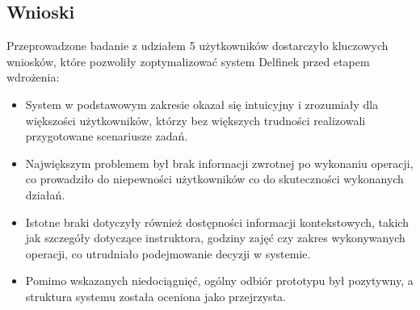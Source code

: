 \documentclass[a4paper,12pt]{article}
\begin{document}
\subsection{Wnioski}
 
Przeprowadzone badanie z udziałem 5 użytkowników dostarczyło kluczowych wniosków, które pozwoliły zoptymalizować system Delfinek przed etapem wdrożenia:
 
\begin{itemize}
    \item System w podstawowym zakresie okazał się intuicyjny i zrozumiały dla większości użytkowników, którzy bez większych trudności realizowali przygotowane scenariusze zadań.
    \item Największym problemem był brak informacji zwrotnej po wykonaniu operacji, co prowadziło do niepewności użytkowników co do skuteczności wykonanych działań.
    \item Istotne braki dotyczyły również dostępności informacji kontekstowych, takich jak szczegóły dotyczące instruktora, godziny zajęć czy zakres wykonywanych operacji, co utrudniało podejmowanie decyzji w systemie.
    \item Pomimo wskazanych niedociągnięć, ogólny odbiór prototypu był pozytywny, a struktura systemu została oceniona jako przejrzysta.
\end{itemize}
\end{document}
